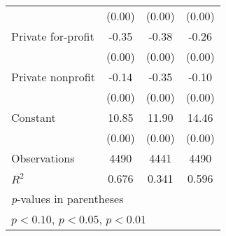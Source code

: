 \begin{table}[htbp]
\begin{tabular}{l*{3}{c}}
                    &      (0.00)         &      (0.00)         &      (0.00)         \\
Private for-profit  &       -0.35\sym{***}&       -0.38\sym{***}&       -0.26\sym{***}\\
                    &      (0.00)         &      (0.00)         &      (0.00)         \\
Private nonprofit   &       -0.14\sym{***}&       -0.35\sym{***}&       -0.10\sym{***}\\
                    &      (0.00)         &      (0.00)         &      (0.00)         \\
Constant            &       10.85\sym{***}&       11.90\sym{***}&       14.46\sym{***}\\
                    &      (0.00)         &      (0.00)         &      (0.00)         \\
\midrule
Observations        &        4490         &        4441         &        4490         \\
\(R^{2}\)           &       0.676         &       0.341         &       0.596         \\
\bottomrule
\multicolumn{4}{l}{\footnotesize \textit{p}-values in parentheses}\\
\multicolumn{4}{l}{\footnotesize \sym{*} \(p<0.10\), \sym{**} \(p<0.05\), \sym{***} \(p<0.01\)}\\
\end{tabular}
\end{table}
